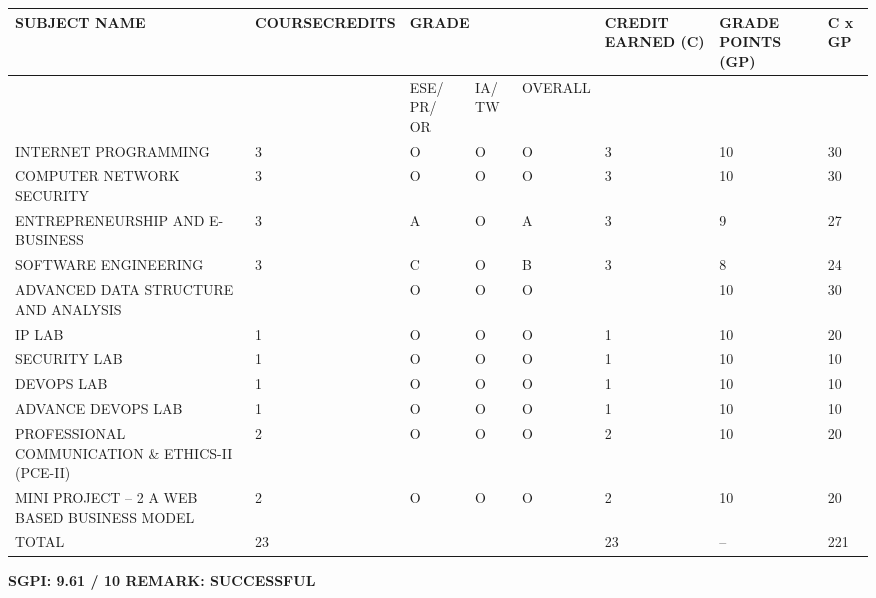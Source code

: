 \documentclass{article} %
\begin{document}
\begin{tabular}{|p{0.8in}|p{0.4in}|p{0.4in}|p{0.3in}|p{0.5in}|p{0.5in}|p{0.5in}|p{0.9in}|} \hline 
\newline SUBJECT NAME & \newline COURSE\newline CREDITS & \multicolumn{3}{|p{1.1in}|}{GRADE} & \newline CREDIT EARNED (C) & \newline GRADE POINTS (GP) & \newline C x GP \\ \hline 
 & \newline  & ESE/ PR/ OR & IA/ TW & \newline OVERALL &  &  & \newline \newline  \\ \hline 
INTERNET PROGRAMMING & 3 & O & O & O & 3 & 10 & 30 \\ \hline 
COMPUTER NETWORK SECURITY & 3 & O & O & O & 3 & 10 & 30 \\ \hline 
ENTREPRENEURSHIP AND E-BUSINESS & 3 & A & O & A & 3 & 9 & 27 \\ \hline 
SOFTWARE ENGINEERING & 3 & C & O & B & 3 & 8 & 24 \\ \hline 
ADVANCED DATA STRUCTURE AND ANALYSIS & \newline 3 & O & O & O & \newline 3 & 10 & 30 \\ \hline 
IP LAB & 1 & O & O & O & 1 & 10 & 20 \\ \hline 
SECURITY LAB & 1 & O & O & O & 1 & 10 & 10 \\ \hline 
DEVOPS LAB & 1 & O & O & O & 1 & 10 & 10 \\ \hline 
ADVANCE DEVOPS LAB & 1 & O & O & O & 1 & 10 & 10 \\ \hline 
PROFESSIONAL COMMUNICATION \& ETHICS-II (PCE-II) & 2 & O & O & O & 2 & 10 & 20 \\ \hline 
MINI PROJECT -- 2 A WEB BASED BUSINESS MODEL & 2 & O & O &          O & 2 & 10 & 20 \\ \hline 
TOTAL\newline  & 23 &  &  &  & 23 & -- & 221 \\ \hline 
\end{tabular}

\textbf{}

\noindent \textbf{SGPI: 9.61 / 10                                                                                  REMARK: SUCCESSFUL}
\end{document}
